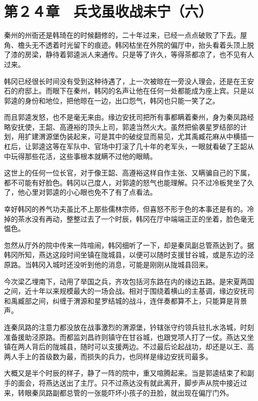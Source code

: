 \section{第２４章　兵戈虽收战未宁（六）}

秦州的州衙还是韩琦在的时候翻修的，二十年过来，已经一点点破败了下去。屋角、檐头无不透着时光留下的痕迹。韩冈枯坐在外院的偏厅中，抬头看着头顶上脱了漆的房梁，静待着郭逵派人来通传。只是等了许久，等得茶都凉了，也不见有人过来。

韩冈已经很长时间没有受到这种待遇了，上一次被晾在一旁没人理会，还是在王安石的府邸上。而眼下在秦州，韩冈的名声让他在任何一处都能成为座上宾。只是以郭逵的身份和地位，把他晾在一边，出口怨气，韩冈也只能一笑了之。

而且郭逵发怒，也不是毫无来由。缘边安抚司把所有事都瞒着秦州，身为秦凤路经略安抚使，王韶、高遵裕的顶头上司，郭逵当然火大。虽然把偷袭星罗结部的计划，用扩建渭源堡伪装起来，可是其中的破绽显而易见，尤其禹臧花麻从中横插一杠后，让郭逵这等在军队中、官场中打滚了几十年的老军头，一眼就看破了王韶从中玩得那些花活，这些事根本就瞒不过他的眼睛。

这世上的任何一位长官，对于像王韶、高遵裕这样自作主张、又瞒骗自己的下属，都不可能有好脸色。韩冈以己度人，对郭逵的怒气也能理解。只不过冷板凳坐了久了，他心里对郭逵的小心眼也免不了有了点看法。

幸好韩冈的养气功夫虽比不上那些儒林宗师，但喜怒不形于色的本事还是有的。冷掉的茶水没有再动，整整过去了一个时辰，韩冈在厅中端端正正的坐着，脸色毫无愠色。

忽然从厅外的院中传来一阵喧闹，韩冈细听了一下，却是秦凤副总管燕达到了。据韩冈所知，燕达这段时间坐镇在陇城县，以便可以随时支援甘谷城，或是东边的泾原路。当韩冈入城时还没听到他的消息，可能是刚刚从陇城县回来。

今次梁乙埋南下，动用了举国之兵，齐攻包括河东路在内的缘边五路。是宋夏两国之间，近十年以来规模最大的一场会战。相对于围绕着横山的主基调，缘边安抚司和禹臧部之间，纠缠于渭源和星罗结城的战斗，连伴奏都算不上，只能算是背景声。

连秦凤路的注意力都没放在战事激烈的渭源堡，钤辖张守约领兵驻扎水洛城，时刻准备援助泾原路。而都监刘昌祚则镇守在甘谷城，也跟党项人打了一仗。燕达又坐镇在两人背后的陇城县，随时可以支援两边。不过最后论起战功，却还是以王、高两人手上的首级数为最，而损失的兵力，也同样是缘边安抚司最多。

大概又是半个时辰的样子，静了一阵的院中，重又喧腾起来。当是郭逵结束了和副手的面会，将燕达送出了主厅。只不过燕达没有就此离开，脚步声从院中接近过来，转眼秦凤路副都总管的一张能吓坏小孩子的丑脸，就出现在偏厅门外。


